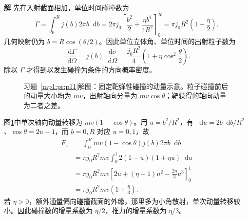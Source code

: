 \documentclass[11pt,openany,fontset=fandol]{ctexbook}
\theoremstyle{definition}\newtheorem{example}{例}[chapter]\newtheorem{exercise}{习题}[chapter]
\newcommand{\SolutionStart}{\par\medskip\ifdim\pagetotal>0pt\ifdim\dimexpr\pagegoal-\pagetotal\relax<3\baselineskip\newpage\fi\fi\noindent\textbf{解}\quad\ignorespaces}
\newenvironment{solution}{\SolutionStart}{\par\medskip}
\newcommand{\dd}{\mathop{}\!\mathrm d}\newcommand{\ee}{\mathrm e}\newcommand{\vct}[1]{\bm{#1}}
\begin{document}
\begin{solution}
先在入射截面相加，单位时间碰撞数为
\[
\Gamma=\int_0^Rj(b)2\pi b\dd b
=2\pi j_0\left[\frac{b^2}{2}+\frac{\eta b^4}{4R^2}\right]_0^R
=\pi j_0R^2\left(1+\frac\eta2\right).
\]
几何映射仍为 $b=R\cos(\theta/2)$。因此单位立体角、单位时间的出射粒子数为
\[
\frac{\dd\Gamma}{\dd\Omega}
=j(b)\frac{\dd\sigma}{\dd\Omega}
=\frac{j_0R^2}{4}\left(1+\eta\cos^2\frac\theta2\right).
\]
除以 $\Gamma$ 才得到以发生碰撞为条件的方向概率密度。

\begin{figure}[H]\centering

\caption{习题~\ref{mp1:pr:p11}解图：固定靶弹性碰撞的动量示意。粒子碰撞前后的动量大小均为 $mv$，出射轴向分量为 $mv\cos\theta$；靶获得的轴向动量为二者之差。}\label{mp1:fig:p11-s}
\end{figure}

图\ref{mp1:fig:p11-s}中单次轴向动量转移为 $mv(1-\cos\theta)$。用 $u=b^2/R^2$，有 $\dd u=2b\dd b/R^2$、$\cos\theta=2u-1$，而 $b=0,R$ 对应 $u=0,1$，故
\begin{align*}
F_z&=\int_0^R mv(1-\cos\theta)j(b)2\pi b\dd b\\
&=\pi j_0R^2mv\int_0^1 2(1-u)(1+\eta u)\dd u\\
&=\pi j_0R^2mv\left[2u+(\eta-1)u^2-\frac{2\eta}{3}u^3\right]_0^1\\
&=\pi j_0R^2mv\left(1+\frac\eta3\right).
\end{align*}
若 $\eta>0$，额外通量偏向碰撞截面的外缘，那里多为小角散射，单次动量转移较小。因此碰撞数的增量系数为 $\eta/2$，推力的增量系数为 $\eta/3$。
\end{solution}
\end{document}
